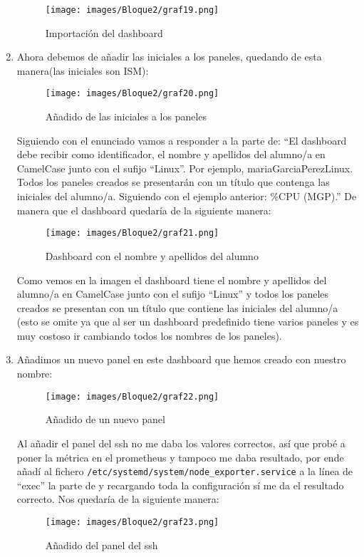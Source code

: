 \begin{enumerate}
\begin{figure}[H]
        \centering
        \texttt{[image: images/Bloque2/graf19.png]}
        \caption{Importación del dashboard}
        \label{fig:importacion_dashboard}
    \end{figure}
    \item Ahora debemos de añadir las iniciales a los paneles, quedando de esta manera(las iniciales son ISM):
    \begin{figure}[H]
        \centering
        \texttt{[image: images/Bloque2/graf20.png]}
        \caption{Añadido de las iniciales a los paneles}
        \label{fig:iniciales_paneles}
    \end{figure} 
    Siguiendo con el enunciado vamos a responder a la parte de:
    ``El dashboard debe recibir como identificador, el nombre y apellidos del alumno/a en CamelCase
    junto con el sufijo “Linux”. Por ejemplo, mariaGarciaPerezLinux. Todos los paneles creados se
    presentarán con un título que contenga las iniciales del alumno/a. Siguiendo con el ejemplo
    anterior: \%CPU (MGP).''
    De manera que el dashboard quedaría de la siguiente manera:
    \begin{figure}[H]
        \centering
        \texttt{[image: images/Bloque2/graf21.png]}
        \caption{Dashboard con el nombre y apellidos del alumno}
        \label{fig:dashboard}
    \end{figure}
    Como vemos en la imagen el dashboard tiene el nombre y apellidos del alumno/a en CamelCase junto con el sufijo “Linux” y todos los paneles creados se presentan con un título que contiene las iniciales del alumno/a (esto se omite ya que al ser un dashboard predefinido tiene varios paneles y es muy costoso ir cambiando todos los nombres de los paneles).
    \item Añadimos un nuevo panel en este dashboard que hemos creado con nuestro nombre:
    \begin{figure}[H]
        \centering
        \texttt{[image: images/Bloque2/graf22.png]}
        \caption{Añadido de un nuevo panel}
        \label{fig:nuevo_panel}
    \end{figure}
    Al añadir el panel del ssh no me daba los valores correctos, así que probé a poner la métrica en el prometheus y tampoco me daba resultado, por ende añadí al fichero \texttt{/etc/systemd/system/node\_exporter.service}
    a la línea de ``exec'' la parte de  y recargando toda la configuración sí me da el resultado correcto. Nos quedaría de la siguiente manera:
    \begin{figure}[H]
        \centering
        \texttt{[image: images/Bloque2/graf23.png]}
        \caption{Añadido del panel del ssh}
        \label{fig:panel_ssh}
    \end{figure}


\end{enumerate}
